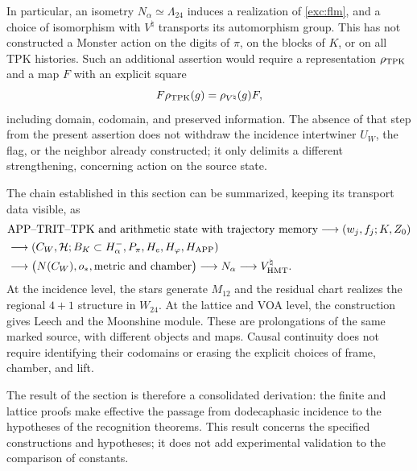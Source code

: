 In particular, an isometry $N_\alpha\simeq\Lambda_{24}$ induces
a realization of \eqref{exc:flm}, and a choice of isomorphism
with $V^\natural$ transports its automorphism group. This has not
constructed a Monster action on the digits of
$\pi$, on the blocks of $K$, or on all TPK histories.
Such an additional assertion would require a representation
$\rho_{\rm TPK}$ and a map $F$ with an explicit square
\[
 F\rho_{\rm TPK}(g)=\rho_{V^\natural}(g)F,
\]
including domain, codomain, and preserved information. The absence
of that step from the present assertion does not withdraw the incidence
intertwiner $U_W$, the flag, or the neighbor already constructed; it only
delimits a different strengthening, concerning action on the source state.

The chain established in this section can be summarized, keeping
its transport data visible, as
\begin{align*}
 &\text{APP--TRIT--TPK and arithmetic state with trajectory memory}
   \longrightarrow (w_j,f_j;K,Z_0)\\
 &\longrightarrow (C_W,\mathcal H;B_K\subset H^-_\alpha,
                   P_\pi,H_e,H_\varphi,H_{\rm APP})\\
 &\longrightarrow \bigl(N(C_W),o_*,\text{metric and chamber}\bigr)
   \longrightarrow N_\alpha
   \longrightarrow V^\natural_{\rm HMT}.
\end{align*}
At the incidence level, the stars generate $M_{12}$ and the
residual chart realizes the regional $4+1$ structure in $W_{24}$.
At the lattice and VOA level, the construction gives Leech and the
Moonshine module. These are prolongations of the same marked source, with
different objects and maps. Causal continuity does not require
identifying their codomains or erasing the explicit choices
of frame, chamber, and lift.

The result of the section is therefore a consolidated derivation:
the finite and lattice proofs make effective the passage from
dodecaphasic incidence to the hypotheses of the recognition
theorems. This result concerns the specified constructions and
hypotheses; it does not add experimental validation to the
comparison of constants.
